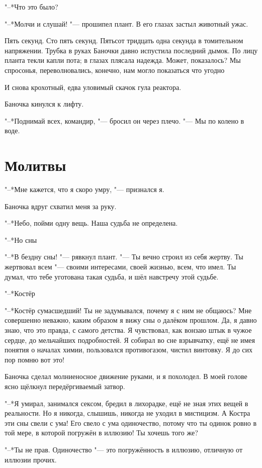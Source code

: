 \documentclass[a4paper,10pt]{book}
\newcommand{\ldotst}{\so{...}\xspace}
\begin{document}
"--*Что это было?

"--*Молчи и слушай! "--- прошипел плант. В его глазах застыл животный ужас.

Пять секунд. Сто пять секунд. Пятьсот тридцать одна секунда в томительном 
напряжении. Трубка в руках Баночки давно испустила последний дымок. По лицу 
планта текли капли пота;
в глазах плясала надежда. Может, показалось? Мы спросонья, 
переволновались, конечно, нам могло показаться что угодно\ldotst

И снова крохотный, едва уловимый скачок гула реактора.

Баночка кинулся к лифту.

"--*Поднимай всех, командир, "--- бросил он через плечо. "--- Мы по колено в 
воде.

\section{Молитвы}

"--*Мне кажется, что я скоро умру, "--- признался я.

Баночка вдруг схватил меня за руку.

"--*Небо, пойми одну вещь. Наша судьба не определена.

"--*Но сны\ldotst

"--*В бездну сны! "--- рявкнул плант. "--- Ты вечно строил из себя жертву.
Ты жертвовал всем "--- своими интересами, своей жизнью, всем, что имел.
Ты думал, что тебе уготована такая судьба, и шёл навстречу этой судьбе.

"--*Костёр\ldotst

"--*Костёр сумасшедший! Ты не задумывался, почему я с ним не общаюсь? 
Мне совершенно неважно, каким образом я вижу сны о далёком прошлом.
Да, я давно знаю, что это правда, с самого детства. Я чувствовал, как вонзаю штык в чужое сердце, до мельчайших подробностей. Я собирал во сне взрывчатку, ещё не имея понятия о началах химии, пользовался противогазом, чистил винтовку. Я до сих пор помню вот это!

Баночка сделал молниеносное движение руками, и я похолодел. В моей голове ясно щёлкнул передёргиваемый затвор.

"--*Я умирал, занимался сексом, бредил в лихорадке, ещё не зная этих вещей в реальности. Но я никогда, слышишь, никогда не уходил в мистицизм. А Костра 
эти
сны свели с ума! Его свело с ума одиночество, потому что
ты одинок ровно в той мере, в которой погружён в иллюзию! Ты хочешь того же?

"--*Ты не прав. Одиночество "--- это погружённость в иллюзию, отличную от 
иллюзии прочих.
\end{document}
